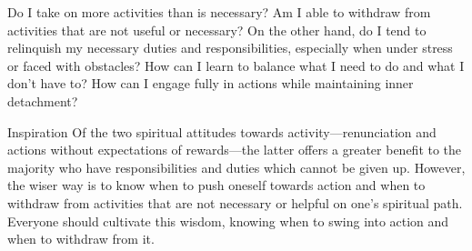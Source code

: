 


\newpage
\begin{mananam}{} 
\mananamtext Do I take on more activities than is necessary? Am I able to withdraw from activities that are not useful or necessary? On the other hand, do I tend to relinquish my necessary duties and responsibilities, especially when under stress or faced with obstacles? How can I learn to balance what I need to do and what I don’t have to? How can I engage fully in actions while maintaining inner detachment?
\end{mananam}
\WritingHand{}
\begin{inspiration}{\mananamfont Inspiration}
\mananamtext Of the two spiritual attitudes towards activity—renunciation and actions without expectations of rewards—the latter offers a greater benefit to the majority who have responsibilities and duties which cannot be given up. However, the wiser way is to know when to push oneself towards action and when to withdraw from activities that are not necessary or helpful on one’s spiritual path. Everyone should cultivate this wisdom, knowing when to swing into action and when to withdraw from it.
\end{inspiration}
\newpage


